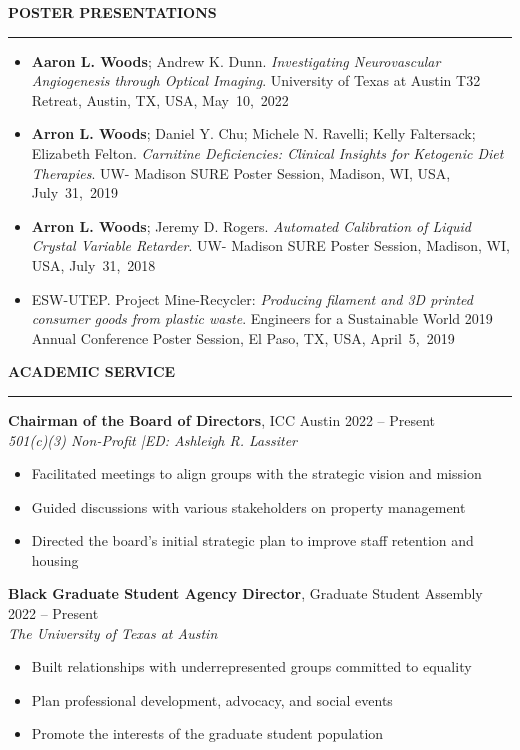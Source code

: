 \documentclass[12pt]{article}
\newcommand{\sectionheading}[1]{%
    \vspace{1.2ex}%
    {\large\bfseries\MakeUppercase{#1}}\par\vspace{0.3ex}%
    {\color[gray]{0.6}\rule{0.98\linewidth}{0.3pt}}\vspace{0.6ex}%
  }
\newcommand{\sectionheading}[1]{%
    \vspace{1.2ex}%
    {\large\bfseries{\SansHead \MakeUppercase{#1}}}\par\vspace{0.3ex}%
    {\color[gray]{0.6}\rule{0.98\linewidth}{0.3pt}}\vspace{0.6ex}%
  }
\newcommand{\jobtitle}[1]{\textbf{#1}} %
\newcommand{\institution}[1]{#1} %
\newcommand{\dateinfo}[1]{\textit{#1}} %
\newcommand{\authorname}[1]{\textbf{#1}} %
\newcommand{\contactsep}{\;|\;} %
\newcommand{\daterange}[2]{#1 -- #2} %
\newcommand{\rightalign}[1]{\hfill #1} %
\begin{document}

\sectionheading{Poster Presentations}

\begin{itemize}
  \item \authorname{Aaron L. Woods}; Andrew K. Dunn. \dateinfo{Investigating Neurovascular Angiogenesis through Optical Imaging}. \institution{University of Texas at Austin T32 Retreat}, Austin, TX, USA, May~10,~2022
  \item \authorname{Arron L. Woods}; Daniel Y. Chu; Michele N. Ravelli; Kelly Faltersack; Elizabeth Felton. \dateinfo{Carnitine Deficiencies: Clinical Insights for Ketogenic Diet Therapies}. \institution{UW- Madison SURE Poster Session}, Madison, WI, USA, July~31,~2019
  \item \authorname{Arron L. Woods}; Jeremy D. Rogers. \dateinfo{Automated Calibration of Liquid Crystal Variable Retarder}. \institution{UW- Madison SURE Poster Session}, Madison, WI, USA, July~31,~2018
  \item ESW-UTEP. Project Mine-Recycler: \dateinfo{Producing filament and 3D printed consumer goods from plastic waste}. \institution{Engineers for a Sustainable World 2019 Annual Conference Poster Session}, El Paso, TX, USA, April~5,~2019
\end{itemize}


\sectionheading{Academic Service}

\jobtitle{Chairman of the Board of Directors}, \institution{ICC Austin} \rightalign{\daterange{2022}{Present}}\\
\dateinfo{501(c)(3) Non-Profit \contactsep ED: Ashleigh R. Lassiter}
\begin{itemize}
  \item Facilitated meetings to align groups with the strategic vision and mission
  \item Guided discussions with various stakeholders on property management
  \item Directed the board's initial strategic plan to improve staff retention and housing
\end{itemize}

\jobtitle{Black Graduate Student Agency Director}, \institution{Graduate Student Assembly} \rightalign{\daterange{2022}{Present}}\\
\dateinfo{The University of Texas at Austin}
\begin{itemize}
  \item Built relationships with underrepresented groups committed to equality
  \item Plan professional development, advocacy, and social events
  \item Promote the interests of the graduate student population
\end{itemize}
\end{document}
